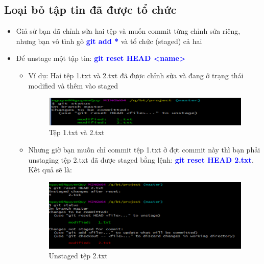 \documentclass[12pt,a4paper]{report}
\begin{document}
\subsection{Loại bỏ tập tin đã được tổ chức}
\begin{itemize}
\item Giả sử bạn đã chỉnh sửa hai tệp và muốn commit từng chỉnh sửa riêng, nhưng bạn vô tình gõ \textcolor{blue}{\bf git add *} và tổ chức (staged) cả hai
\item Để unstage một tập tin: \textcolor{blue}{\bf git reset HEAD <name>}
	\begin{itemize}
\item Ví dụ: Hai tệp 1.txt và 2.txt đã được chỉnh sửa và đang ở trạng thái modified và thêm vào staged

\begin{figure}[!ht]
	\centering
	\includegraphics[width=0.8\linewidth]{screenshot029}
\caption{Tệp 1.txt và 2.txt}
	\label{fig:screenshot029}
	\end{figure}

\item Nhưng giờ bạn muốn chỉ commit tệp 1.txt ở đợt commit này thì bạn phải unstaging tệp 2.txt đã được staged bằng lệnh: \textcolor{blue}{\bf git reset HEAD 2.txt}. Kết quả sẽ là:

\begin{figure}[!ht]
	\centering
	\includegraphics[width=0.8\linewidth]{screenshot030}
\caption{Unstaged tệp 2.txt}
	\label{fig:screenshot030}
	\end{figure}
	
\end{itemize}
\end{itemize}
\end{document}
